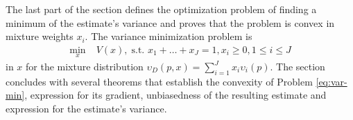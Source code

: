 The last part of the section defines the optimization problem of finding a minimum of the estimate's variance and proves that the problem is convex in mixture weights $x_i$.
The variance minimization problem is
\begin{align}
    \min_x \; & V(x), \; 
    \text{s.t. } x_1 + \dots + x_J = 1, x_i \ge 0, 1\!\le\! i \!\le\! J\label{eq:var-min}
\end{align}
in $x$ for the mixture distribution $\upsilon_D(p,x) = \sum_{i=1}^J x_i \upsilon_i(p)$. %
The section concludes with several theorems that establish the convexity of Problem \eqref{eq:var-min}, expression for its gradient, unbiasedness of the resulting estimate and expression for the estimate's variance.



